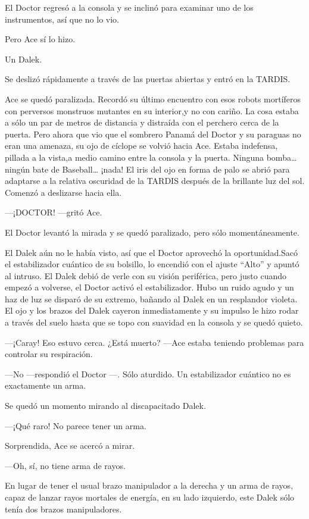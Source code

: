 El Doctor regresó a la consola y se inclinó para examinar uno de
los instrumentos, así que no lo vio.

Pero Ace sí lo hizo.

Un Dalek.

Se deslizó rápidamente a través de las puertas abiertas y entró
en la TARDIS.

Ace se quedó paralizada. Recordó su último encuentro con esos
robots mortíferos con perversos monstruos mutantes en su interior,y no
con cariño. La cosa estaba a sólo un par de metros de distancia y
distraída con el perchero cerca de la puerta. Pero ahora que vio que el
sombrero Panamá del Doctor y su paraguas no eran una amenaza, su ojo de
cíclope se volvió hacia Ace. Estaba indefensa, pillada a la vista,a
medio camino entre la consola y la puerta. Ninguna bomba\ldots{} ningún
bate de Baseball\ldots{} ¡nada! El iris del ojo en forma de palo se
abrió para adaptarse a la relativa oscuridad de la TARDIS después de la
brillante luz del sol. Comenzó a deslizarse hacia ella.

---¡DOCTOR! ---gritó Ace.

El Doctor levantó la mirada y se quedó paralizado, pero sólo
momentáneamente.

El Dalek aún no le había visto, así que el Doctor aprovechó la
oportunidad.Sacó el estabilizador cuántico de su bolsillo, lo encendió
con el ajuste ``Alto'' y apuntó al intruso. El Dalek debió de verle con
su visión periférica, pero justo cuando empezó a volverse, el Doctor
activó el estabilizador. Hubo un ruido agudo y un haz de luz se disparó
de su extremo, bañando al Dalek en un resplandor violeta. El ojo y los
brazos del Dalek cayeron inmediatamente y su impulso le hizo rodar a
través del suelo hasta que se topo con suavidad en la consola y se quedó
quieto.

---¡Caray! Eso estuvo cerca. ¿Está muerto? ---Ace estaba
teniendo problemas para controlar su respiración.

---No ---respondió el Doctor ---. Sólo aturdido. Un
estabilizador cuántico no es exactamente un arma.

Se quedó un momento mirando al discapacitado Dalek.

---¡Qué raro! No parece tener un arma.

Sorprendida, Ace se acercó a mirar.

---Oh, sí, no tiene arma de rayos.

En lugar de tener el usual brazo manipulador a la derecha y un
arma de rayos, capaz de lanzar rayos mortales de energía, en su lado
izquierdo, este Dalek sólo tenía dos brazos manipuladores.

